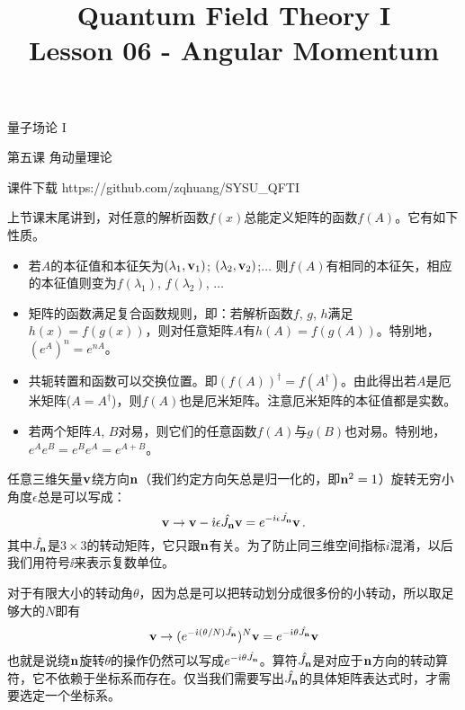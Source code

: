 \documentclass[CJK]{beamer}
\title{Quantum Field Theory I \\ Lesson 06 - Angular Momentum}
\author{}
\date{}
\begin{document}
\begin{frame}
 
\begin{center}
\begin{Large}
\bch
量子场论 I 

{\vskip 0.3in}

第五课 角动量理论

\ech
\end{Large}
\end{center}

\vskip 0.2in

\bch
课件下载
\ech
https://github.com/zqhuang/SYSU\_QFTI

\end{frame}



\begin{frame}
\bch
上节课末尾讲到，对任意的解析函数$f(x)$总能定义矩阵的函数$f(A)$。它有如下性质。
\begin{itemize}
\item{若$A$的本征值和本征矢为$(\lambda_1, {\mathbf{v}}_1)$; $(\lambda_2, {\mathbf{v}}_2)$;$\ldots$ 则$f(A)$有相同的本征矢，相应的本征值则变为$f(\lambda_1)$, $f(\lambda_2)$, $\ldots$}
\item{矩阵的函数满足复合函数规则，即：若解析函数$f$, $g$, $h$满足$h(x) = f(g(x))$，则对任意矩阵$A$有$h(A)=f(g(A))$。特别地，$(e^A)^n = e^{nA}$。}
\item{共轭转置和函数可以交换位置。即$\left(f(A)\right)^\dagger = f(A^\dagger)$。由此得出若$A$是厄米矩阵($A=A^\dagger$)，则$f(A)$也是厄米矩阵。注意厄米矩阵的本征值都是实数。}
\item{若两个矩阵$A$, $B$对易，则它们的任意函数$f(A)$与$g(B)$也对易。特别地，$ e^{A}e^{B} = e^{B}e^{A}=e^{A+B}$。}
\end{itemize}

\ech
\end{frame}

\begin{frame}
\bch
任意三维矢量${\mathbf{v}}$绕方向${\mathbf{n}}$（我们约定方向矢总是归一化的，即${\mathbf{n}}^2=1$）旋转无穷小角度$\epsilon$总是可以写成：
$${\mathbf{v}} \rightarrow {\mathbf{v}} - {\dot{\imath}}\epsilon {\hat{J_{\mathbf{n}}}} {\mathbf{v}} = e^{-{\dot{\imath}}\epsilon{\hat{J_{\mathbf{n}}}}}{\mathbf{v}}\,.$$
其中${\hat{J_{\mathbf{n}}}}$是$3\times 3$的转动矩阵，它只跟${\mathbf{n}}$有关。为了防止同三维空间指标$i$混淆，以后我们用符号$\ii$来表示复数单位。

对于有限大小的转动角$\theta$，因为总是可以把转动划分成很多份的小转动，所以取足够大的$N$即有
$${\mathbf{v}}\rightarrow (e^{-{\dot{\imath}}(\theta/N){\hat{J_{\mathbf{n}}}}})^N{\mathbf{v}} = e^{-{\dot{\imath}}\theta {\hat{J_{\mathbf{n}}}}}{\mathbf{v}}$$
也就是说绕${\mathbf{n}}$旋转$\theta$的操作仍然可以写成$e^{-{\dot{\imath}}\theta {\hat{J_{\mathbf{n}}}}}$。算符${\hat{J_{\mathbf{n}}}}$是对应于${\mathbf{n}}$方向的转动算符，它不依赖于坐标系而存在。仅当我们需要写出${\hat{J_{\mathbf{n}}}}$的具体矩阵表达式时，才需要选定一个坐标系。

\ech
\end{frame}
\end{document}
